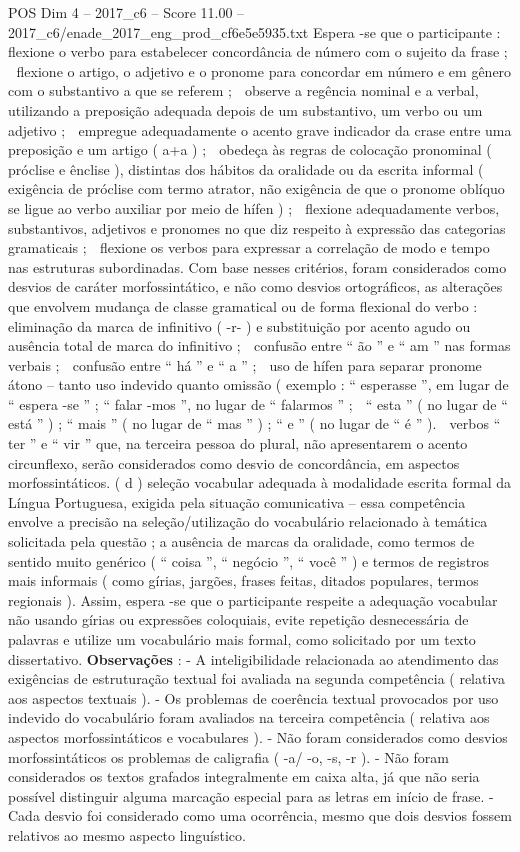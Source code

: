 \begin{textsample}{POS Dim 4 – 2017\_c6 – Score 11.00 – 2017\_c6/enade\_2017\_eng\_prod\_cf6e5e5935.txt}
Espera -se que o participante :  flexione o verbo para estabelecer concordância de número com o sujeito da frase ;  flexione o artigo, o adjetivo e o pronome para concordar em número e em gênero com o substantivo a que se referem ;  observe a regência nominal e a verbal, utilizando a preposição adequada depois de um substantivo, um verbo ou um adjetivo ;  empregue adequadamente o acento grave indicador da crase entre uma preposição e um artigo ( a+a ) ;  obedeça às regras de colocação pronominal ( próclise e ênclise ), distintas dos hábitos da oralidade ou da escrita informal ( exigência de próclise com termo atrator, não exigência de que o pronome oblíquo se ligue ao verbo auxiliar por meio de hífen ) ;  flexione adequadamente verbos, substantivos, adjetivos e pronomes no que diz respeito à expressão das categorias gramaticais ;  flexione os verbos para expressar a correlação de modo e tempo nas estruturas subordinadas.
Com base nesses critérios, foram considerados como desvios de caráter morfossintático, e não como desvios ortográficos, as alterações que envolvem mudança de classe gramatical ou de forma flexional do verbo :  eliminação da marca de infinitivo ( -r- ) e substituição por acento agudo ou ausência total de marca do infinitivo ;  confusão entre “ ão ” e “ am ” nas formas verbais ;  confusão entre “ há ” e “ a ” ;  uso de hífen para separar pronome átono – tanto uso indevido quanto omissão ( exemplo : “ esperasse ”, em lugar de “ espera -se ” ; “ falar -mos ”, no lugar de “ falarmos ” ;  “ esta ” ( no lugar de “ está ” ) ; “ mais ” ( no lugar de “ mas ” ) ; “ e ” ( no lugar de “ é ” ).  verbos “ ter ” e “ vir ” que, na terceira pessoa do plural, não apresentarem o acento circunflexo, serão considerados como desvio de concordância, em aspectos morfossintáticos. ( d ) seleção vocabular adequada à modalidade escrita formal da Língua Portuguesa, exigida pela situação comunicativa – essa competência envolve a precisão na seleção/utilização do vocabulário relacionado à temática solicitada pela questão ; a ausência de marcas da oralidade, como termos de sentido muito genérico ( “ coisa ”, “ negócio ”, “ você ” ) e termos de registros mais informais ( como gírias, jargões, frases feitas, ditados populares, termos regionais ).
Assim, espera -se que o participante respeite a adequação vocabular não usando gírias ou expressões coloquiais, evite repetição desnecessária de palavras e utilize um vocabulário mais formal, como solicitado por um texto dissertativo. \textbf{Observações} : - A inteligibilidade relacionada ao atendimento das exigências de estruturação textual foi avaliada na segunda competência ( relativa aos aspectos textuais ). - Os problemas de coerência textual provocados por uso indevido do vocabulário foram avaliados na terceira competência ( relativa aos aspectos morfossintáticos e vocabulares ). - Não foram considerados como desvios morfossintáticos os problemas de caligrafia ( -a/ -o, -s, -r ). - Não foram considerados os textos grafados integralmente em caixa alta, já que não seria possível distinguir alguma marcação especial para as letras em início de frase. - Cada desvio foi considerado como uma ocorrência, mesmo que dois desvios fossem relativos ao mesmo aspecto linguístico.

\end{textsample}
